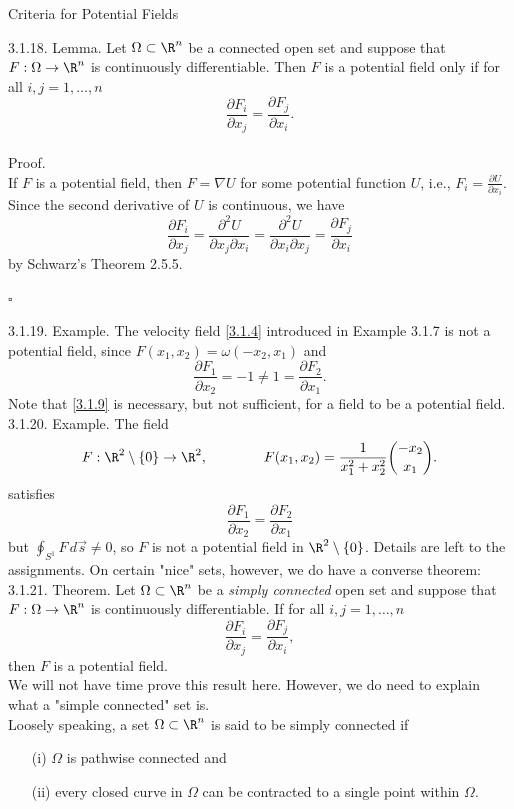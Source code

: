 \documentclass[smaller,hyperref={CJKbookmarks=true}]{beamer}
\begin{document}
\begin{frame}{Criteria for Potential Fields}
\begin{spacing}{1}
\alert{3.1.18. Lemma.} Let $\Omega\subset\R^n$ be a connected open set and suppose that $F:\Omega\to\R^n$ is continuously dif{}ferentiable. Then $F$ is a potential field only if for all $i,j=1,\ldots,n$
\begin{equation}\label{3.1.9}
  \frac{\partial F_i}{\partial x_j}=
  \frac{\partial F_j}{\partial x_i}.
\end{equation}
 \\[12pt]
\alert{Proof.}\\
If $F$ is a potential field, then $F=\nabla U$ for some potential function $U$, i.e., $F_i=\frac{\partial U}{\partial x_i}$. Since the second derivative of $U$ is continuous, we have
\[\frac{\partial F_i}{\partial x_j}
=\frac{\partial^2U}{\partial x_j\partial x_i}=\frac{\partial^2U}{\partial x_i\partial x_j}=\frac{\partial F_j}{\partial x_i}\]
by Schwarz's Theorem 2.5.5.
\begin{flushright}
  $\square$
\end{flushright}
\newpage
\alert{3.1.19. Example.} The velocity field \eqref{3.1.4} introduced in Example 3.1.7 is not a potential field, since $F(x_1,x_2)=\omega(-x_2,x_1)$ and
\[\frac{\partial F_1}{\partial x_2}=-1\neq1=\frac{\partial F_2}{\partial x_1}.\]
Note that \eqref{3.1.9} is necessary, but not suf{}ficient, for a field to be a potential field.\\[5pt]
\alert{3.1.20. Example.} The field
\[F:\R^2\setminus\{0\}\to\R^2,\qquad\qquad
F(x_1,x_2)=\frac{1}{x_1^2+x_2^2}\binom{-x_2}{x_1}.\]
satisfies
\[\frac{\partial F_1}{\partial x_2}=\frac{\partial F_2}{\partial x_1}\]
but $\oint_{S^1}F\,d\vec{s}\neq0$, so $F$ is not a potential field in $\R^2\setminus\{0\}$. Details are left to the assignments.
\newpage
On certain "nice" sets, however, we do have a converse theorem:\\[5pt]
\alert{3.1.21. Theorem.} Let $\Omega\subset\R^n$ be a \emph{simply connected} open set and suppose that $F:\Omega\to\R^n$ is continuously dif{}ferentiable. If for all $i,j=1,\ldots,n$
\[\frac{\partial F_i}{\partial x_j}
=\frac{\partial F_j}{\partial x_i},\]
then $F$ is a potential field.\\[4pt]
We will not have time prove this result here. However, we do need to
explain what a "simple connected" set is.\\[5pt]
Loosely speaking, a set $\Omega\subset\R^n$ is said to be simply connected if
\begin{itemize}
  \item[(i)] $\Omega$ is pathwise connected and
  \item[(ii)] every closed curve in $\Omega$ can be contracted to a single point within $\Omega$.
\end{itemize}
\end{spacing}
\end{frame}
\end{document}
